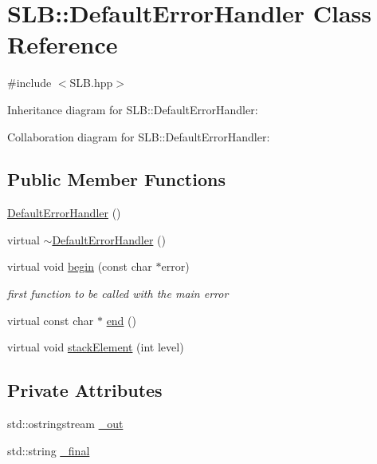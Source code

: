 \hypertarget{classSLB_1_1DefaultErrorHandler}{}\section{S\+LB\+:\+:Default\+Error\+Handler Class Reference}
\label{classSLB_1_1DefaultErrorHandler}


{\ttfamily \#include $<$S\+L\+B.\+hpp$>$}



Inheritance diagram for S\+LB\+:\+:Default\+Error\+Handler\+:


Collaboration diagram for S\+LB\+:\+:Default\+Error\+Handler\+:
\subsection*{Public Member Functions}
\begin{DoxyCompactItemize}
\item 
\hyperlink{classSLB_1_1DefaultErrorHandler_ab62427aa19bcd86896998bb41ce94cf4}{Default\+Error\+Handler} ()
\item 
virtual \hyperlink{classSLB_1_1DefaultErrorHandler_aabb8777a6a7d5cd1e4ea2eeb1447be13}{$\sim$\+Default\+Error\+Handler} ()
\item 
virtual void \hyperlink{classSLB_1_1DefaultErrorHandler_ae9a3f37002f6b5b3cd785cb200e08b35}{begin} (const char $\ast$error)
\begin{DoxyCompactList}\small\item\em first function to be called with the main error \end{DoxyCompactList}\item 
virtual const char $\ast$ \hyperlink{classSLB_1_1DefaultErrorHandler_ade69f2daa1ab65b5626cd1059a7af229}{end} ()
\item 
virtual void \hyperlink{classSLB_1_1DefaultErrorHandler_a5edd0ac3f13251639a912b212e1d51c0}{stack\+Element} (int level)
\end{DoxyCompactItemize}
\subsection*{Private Attributes}
\begin{DoxyCompactItemize}
\item 
std\+::ostringstream \hyperlink{classSLB_1_1DefaultErrorHandler_a11b0c953d8811a5fe00cab385c14e4b1}{\+\_\+out}
\item 
std\+::string \hyperlink{classSLB_1_1DefaultErrorHandler_a2df7d031a80cda55bf2be125f4d03033}{\+\_\+final}
\end{DoxyCompactItemize}
